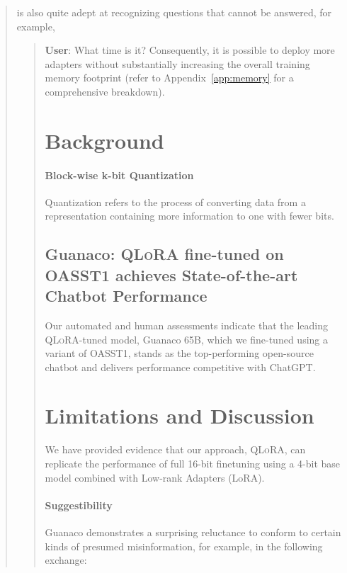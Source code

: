 \begin{abstract}
is also quite adept at recognizing questions that cannot be answered, for example,

\begin{quote}
    \textbf{User}: What time is it? Consequently, it is possible to deploy more adapters without substantially increasing the overall training memory footprint (refer to Appendix~\ref{app:memory} for a comprehensive breakdown). \section{Background}
\paragraph{Block-wise k-bit Quantization} Quantization refers to the process of converting data from a representation containing more information to one with fewer bits. \subsection{\textbf{Guanaco}: \textsc{QLoRA} fine-tuned on OASST1 achieves State-of-the-art Chatbot Performance} Our automated and human assessments indicate that the leading \textsc{QLoRA}-tuned model, {Guanaco} 65B, which we fine-tuned using a variant of OASST1, stands as the top-performing open-source chatbot and delivers performance competitive with ChatGPT. \section{Limitations and Discussion}

We have provided evidence that our approach, \textsc{QLoRA}, can replicate the performance of full 16-bit finetuning using a 4-bit base model combined with Low-rank Adapters (LoRA). \paragraph{Suggestibility} {Guanaco} demonstrates a surprising reluctance to conform to certain kinds of presumed misinformation, for example, in the following exchange:


\end{quote}
\end{abstract}
